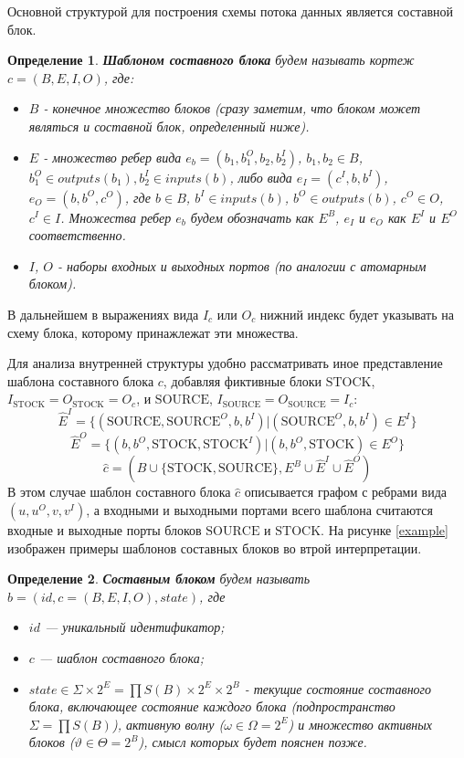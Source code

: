 \documentclass[10pt,a4paper]{article}
\newtheorem{defen}{Определение}
\newcommand{\stock}{\text{STOCK}}
\newcommand{\source}{\text{SOURCE}}
\begin{document}
Основной структурой для построения схемы потока данных является составной блок.

\begin{defen}
 \textbf{Шаблоном составного блока} будем называть кортеж $c = (B, E, I, O)$, где:
 \begin{itemize}
    \item $B$ - конечное множество блоков (сразу заметим, что блоком может являться и составной блок, определенный ниже).
    \item $E$ - множество ребер вида $e_b = (b_1, b^O_{1}, b_2, b^I_{2})$, $b_1, b_2 \in B$, $b^O_{1} \in outputs(b_1), b^I_{2} \in inputs(b)$,
                либо вида $e_I = (c^I, b, b^I)$, $e_O = (b, b^O, c^O)$, где $b \in B$, $b^I \in inputs(b)$, $b^O \in outputs(b)$, $c^O \in O$, $c^I \in I$.
                Множества ребер $e_b$ будем обозначать как $E^B$, $e_I$ и $e_O$ как $E^I$ и $E^O$ соответственно.
    \item $I$, $O$ - наборы входных и выходных портов (по аналогии с атомарным блоком).
  \end{itemize}
\end{defen}

В дальнейшем в выражениях вида $I_c$ или $O_c$ нижний индекс будет указывать на схему блока, которому принажлежат эти множества.

Для анализа внутренней структуры удобно рассматривать иное представление шаблона составного блока $c$, добавляя фиктивные блоки $\stock$, $I_{\stock} = O_{\stock} = O_c$,
  и $\source$, $I_{\source} = O_{\source} = I_c$:
$$\hat{E}^I = \{(\source, \source^O, b, b^I) \vert (\source^O, b, b^I) \in E^I\}$$
$$\hat{E}^O = \{ (b, b^O, \stock, \stock^I) \vert (b, b^O, \stock) \in E^O \}$$
$$\hat{c} = (B \cup \{\stock, \source\}, E^B \cup \hat{E}^I \cup \hat{E}^O)$$
В этом случае шаблон составного блока $\hat{c}$ описывается графом с ребрами вида $(u, u^O, v, v^I)$,
а входными и выходными портами всего шаблона считаются входные и выходные порты блоков $\source$ и $\stock$.
На рисунке \ref{example} изображен примеры шаблонов составных блоков во втрой интерпретации.

\begin{defen}
  \textbf{Составным блоком} будем называть $b = (id, c = (B, E, I, O), state)$, где
  \begin{itemize}
    \item $id$ --- уникальный идентификатор;
    \item $c$ --- шаблон составного блока;
    \item $state \in \Sigma \times 2^E = \prod S(B) \times 2^E \times 2^B$ - текущие состояние составного блока, включающее
          состояние каждого блока (подпространство $\Sigma = \prod S(B)$), активную волну ($\omega \in \Omega = 2^E$) и
          множество активных блоков ($\vartheta \in \Theta = 2^B$), смысл которых будет пояснен позже.
  \end{itemize}
\end{defen}
\end{document}
